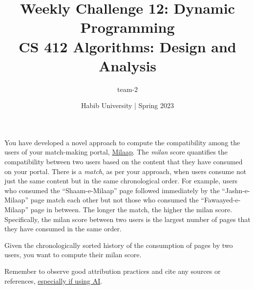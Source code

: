 \documentclass[a4paper]{exam}
\title{Weekly Challenge 12: Dynamic Programming\\CS 412 Algorithms: Design and Analysis}
\author{team-2}  %
\date{Habib University | Spring 2023}
\begin{document}
\maketitle

\begin{questions}



	You have developed a novel approach to compute the compatibility among the users of your match-making portal, \href{https://habib.edu.pk}{Milaap}. The \textit{milan} score quantifies the compatibility between two users based on the content that they have consumed on your portal. There is a \textit{match}, as per your approach, when users consume not just the same content but in the same chronological order. For example, users who consumed the ``Shaam-e-Milaap'' page followed immediately by the ``Jashn-e-Milaap'' page match each other but not those who consumed the ``Fawaayed-e-Milaap'' page in between. The longer the match, the higher the milan score. Specifically, the milan score between two users is the largest number of pages that they have consumed in the same order.

	Given the chronologically sorted history of the consumption of pages by two users, you want to compute their milan score.
	Remember to observe good attribution practices and cite any sources or references, \href{https://hulms.instructure.com/courses/2616/discussion_topics/29240}{especially if using AI}.

	\begin{solution}
		\begin{parts}

\end{parts}
\end{solution}
\end{questions}
\end{document}
